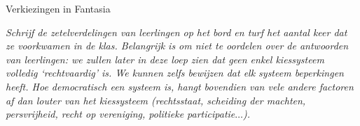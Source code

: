 \begin{lesactiviteit}{Verkiezingen in Fantasia}
\begin{vraagenantwoord}
\item {}
\end{vraagenantwoord}

\textit{Schrijf de zetelverdelingen van leerlingen op het bord en turf het aantal keer dat ze voorkwamen in de klas. Belangrijk is om niet te oordelen over de antwoorden van leerlingen: we zullen later in deze loep zien dat geen enkel kiessysteem volledig `rechtvaardig' is. We kunnen zelfs bewijzen dat elk systeem beperkingen heeft. Hoe democratisch een systeem is, hangt bovendien van vele andere factoren af dan louter van het kiessysteem (rechtsstaat, scheiding der machten, persvrijheid, recht op vereniging, politieke participatie$\ldots$).}
\end{lesactiviteit}
